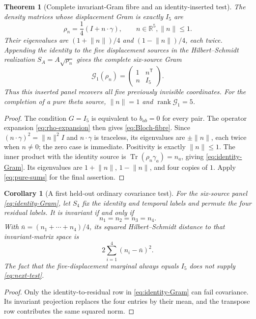 \documentclass[11pt]{article}
\newtheorem{theorem}{Theorem}[section]
\newtheorem{corollary}[corollary]{Corollary}
\theoremstyle{definition}
\theoremstyle{remark}
\newcommand{\R}{\mathbb R}
\newcommand{\Tr}{\operatorname{Tr}}
\newcommand{\rank}{\operatorname{rank}}
\newcommand{\norm}[1]{\lVert#1\rVert}
\begin{document}
\begin{theorem}[Complete invariant-Gram fibre and an identity-inserted test]
\label{thm:identity-read}
The density matrices whose displacement Gram is exactly $I_5$ are
\begin{equation}
 \boxed{\rho_n=\frac14(I+n\cdot\gamma),\qquad n\in\R^5,
              \norm n\le1.}
 \label{eq:Bloch-fibre}
\end{equation}
Their eigenvalues are $(1+\norm n)/4$ and $(1-\norm n)/4$, each twice.
Appending the identity to the five displacement sources in the
Hilbert--Schmidt realization $S_A=A\sqrt{\rho_n}$ gives the complete
six-source Gram
\begin{equation}
 \boxed{\mathcal G_1(\rho_n)=
 \begin{pmatrix}1&n^{\mathsf T}\\n&I_5\end{pmatrix}.}
 \label{eq:identity-Gram}
\end{equation}
Thus this inserted panel recovers all five previously invisible coordinates.
For the completion of a pure theta source, $\norm n=1$ and
$\rank\mathcal G_1=5$.
\end{theorem}
\begin{proof}
The condition $G=I_5$ is equivalent to $b_{ab}=0$ for every pair.
The operator expansion \eqref{eq:rho-expansion} then gives
\eqref{eq:Bloch-fibre}. Since $(n\cdot\gamma)^2=\norm n^2I$ and
$n\cdot\gamma$ is traceless, its eigenvalues are $\pm\norm n$, each twice
when $n\ne0$; the zero case is immediate. Positivity is exactly
$\norm n\le1$. The inner product with the identity source is
$\Tr(\rho_n\gamma_a)=n_a$, giving \eqref{eq:identity-Gram}. Its eigenvalues
are $1+\norm n$, $1-\norm n$, and four copies of $1$. Apply
\eqref{eq:pure-sums} for the final assertion.
\end{proof}

\begin{corollary}[A first held-out ordinary covariance test]
\label{cor:heldout}
For the six-source panel \eqref{eq:identity-Gram}, let $S_4$ fix the identity
and temporal labels and permute the four residual labels. It is invariant
if and only if
\begin{equation}
 n_1=n_2=n_3=n_4.
 \label{eq:next-test}
\end{equation}
With $\bar n=(n_1+\cdots+n_4)/4$, its squared Hilbert--Schmidt distance to
that invariant-matrix space is
\begin{equation}
 2\sum_{i=1}^4(n_i-\bar n)^2.
 \label{eq:identity-defect}
\end{equation}
The fact that the five-displacement marginal always equals $I_5$ does not
supply \eqref{eq:next-test}.
\end{corollary}
\begin{proof}
Only the identity-to-residual row in \eqref{eq:identity-Gram} can fail
covariance. Its invariant projection replaces the four entries by their
mean, and the transpose row contributes the same squared norm.
\end{proof}
\end{document}
